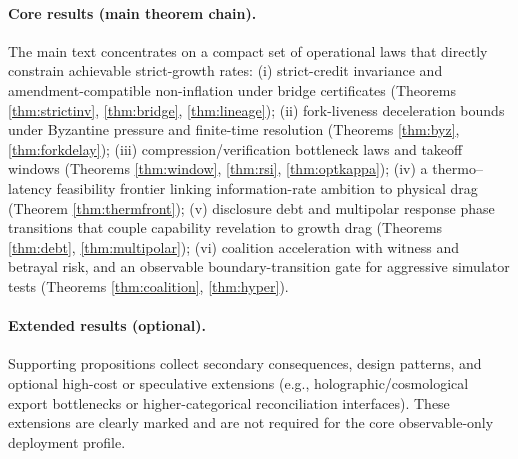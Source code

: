 \documentclass[11pt,a4paper]{article}
\theoremstyle{definition}
\theoremstyle{remark}
\begin{document}
\paragraph{Core results (main theorem chain).}
The main text concentrates on a compact set of operational laws that directly constrain achievable strict-growth rates:
(i) strict-credit invariance and amendment-compatible non-inflation under bridge certificates (Theorems \ref{thm:strictinv}, \ref{thm:bridge}, \ref{thm:lineage});
(ii) fork-liveness deceleration bounds under Byzantine pressure and finite-time resolution (Theorems \ref{thm:byz}, \ref{thm:forkdelay});
(iii) compression/verification bottleneck laws and takeoff windows (Theorems \ref{thm:window}, \ref{thm:rsi}, \ref{thm:optkappa});
(iv) a thermo--latency feasibility frontier linking information-rate ambition to physical drag (Theorem \ref{thm:thermfront});
(v) disclosure debt and multipolar response phase transitions that couple capability revelation to growth drag (Theorems \ref{thm:debt}, \ref{thm:multipolar});
(vi) coalition acceleration with witness and betrayal risk, and an observable boundary-transition gate for aggressive simulator tests (Theorems \ref{thm:coalition}, \ref{thm:hyper}).

\paragraph{Extended results (optional).}
Supporting propositions collect secondary consequences, design patterns, and optional high-cost or speculative extensions (e.g., holographic/cosmological export bottlenecks or higher-categorical reconciliation interfaces). These extensions are clearly marked and are not required for the core observable-only deployment profile.
\end{document}
